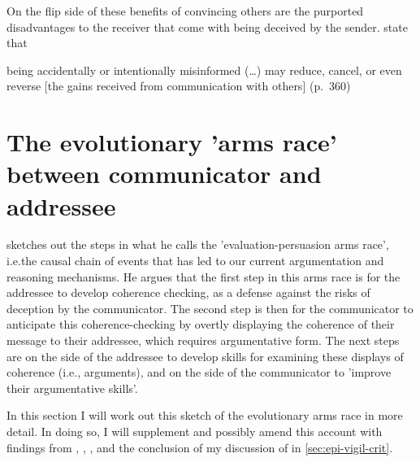 
On the flip side of these benefits of convincing others are the purported disadvantages to the receiver that come with being deceived by the sender. \citet{Sperber10} state that
\begin{quoting}
    being accidentally or intentionally misinformed (\ldots) may reduce, cancel, or even reverse [the gains received from communication with others]
    \hfill (p.~360)
\end{quoting}

\section{The evolutionary 'arms race' between communicator and addressee}
\label{sec:arms-race}

\citet{Sperber01} sketches out the steps in what he calls the 'evaluation-persuasion arms race', i.e.\@ the causal chain of events that has led to our current argumentation and reasoning mechanisms.
He argues that the first step in this arms race is for the addressee to develop coherence checking, as a defense against the risks of deception by the communicator. The second step is then for the communicator to anticipate this coherence-checking by overtly displaying the coherence of their message to their addressee, which requires argumentative form. The next steps are on the side of the addressee to develop skills for examining these displays of coherence (i.e., arguments), and on the side of the communicator to 'improve their argumentative skills'.

In this section I will work out this sketch of the evolutionary arms race in more detail. In doing so, I will supplement and possibly amend this account with findings from \citet{Sperber10}, \citet{MS11}, \citet{Reboul17}, and the conclusion of my discussion of \citet{Michaelian13} in \cref{sec:epi-vigil-crit}.


